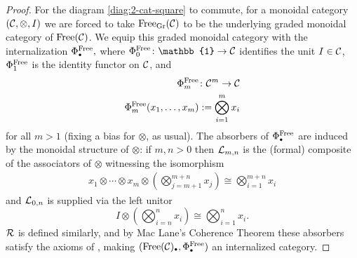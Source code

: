 \documentclass[openany, amssymb, psamsfonts]{amsart}
\theoremstyle{definition}
\numberwithin{equation}{section}
\begin{document}
\begin{proof}
For the diagram \eqref{diag:2-cat-square} to commute, for a monoidal category $(\mathcal{C}, \otimes, I)$ we are forced to take $\mathrm{Free}_\mathrm{Gr}(\mathcal{C})$ to be the underlying graded monoidal category of $\mathrm{Free}(\mathcal{C})$. We equip this graded monoidal category with the internalization $\Phi^\Free_\sbull,$ where $\Phi^\Free_0 \colon \mathbb{1} \to \C$ identifies the unit $I \in \mathcal{C}$, $\Phi^{\mathrm{Free}}_1$ is the identity functor on $\mathcal{C}$, and
\begin{align*}
    \Phi^{\mathrm{Free}}_m &\colon \mathcal{C}^m \to \mathcal{C}\\
    \Phi^{\mathrm{Free}}_m(x_1, \dots, x_m) &:= \bigotimes_{i=1}^m x_i
\end{align*}for all $m > 1$ (fixing a bias for $\otimes$, as usual). The absorbers of $\Phi^\Free_\sbull$ are induced by the monoidal structure of $\otimes$: if $m, n > 0$ then $\mathcal{L}_{m, n}$ is the (formal) composite \cite{maclane} of the associators of $\otimes$ witnessing the isomorphism
\begin{align*}
    x_1 \otimes \cdots \otimes x_m \otimes \left(\bigotimes_{j = m+1}^{m+n} x_j\right) \cong \bigotimes_{i = 1}^{m + n} x_i
\end{align*} and $\mathcal{L}_{0, n}$ is supplied via the left unitor
\begin{equation*}
    I \otimes \left(\bigotimes_{i = n}^n x_i\right) \cong \bigotimes_{i=1}^n x_i.
\end{equation*} $\mathcal{R}$ is defined similarly, and by Mac Lane's Coherence Theorem these absorbers satisfy the axioms of , making $(\Free(\C)_\sbull, \Phi^\Free_\sbull)$ an internalized category.


\end{proof}
\end{document}
